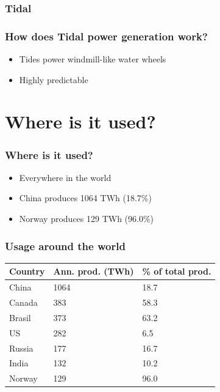 \documentclass{beamer}
\begin{document}
\subsubsection{Tidal}
\begin{frame}
\frametitle{How does Tidal power generation work?}
\begin{itemize}
	\item Tides power windmill-like water wheels
	\item Highly predictable
\end{itemize}
\end{frame}

\section{Where is it used?}
\begin{frame}
\frametitle{Where is it used?}
\begin{itemize}
	\item Everywhere in the world
	\item China produces 1064 TWh (18.7\%)
	\item Norway produces 129 TWh (96.0\%)
\end{itemize}
\end{frame}

\begin{frame}
\frametitle{Usage around the world}
    \begin{tabularx}{\textwidth}{X|XX}
    Country & Ann. prod. (TWh) & \% of total prod.\\ \hline
    China   & 1064                                  & 18.7                   \\
    Canada  & 383                                   & 58.3                   \\
    Brasil  & 373                                   & 63.2                   \\
    US      & 282                                   & 6.5                    \\
    Russia  & 177                                   & 16.7                   \\
    India   & 132                                   & 10.2                   \\
    Norway  & 129                                   & 96.0                   \\
\end{tabularx}
\end{frame}
\end{document}
